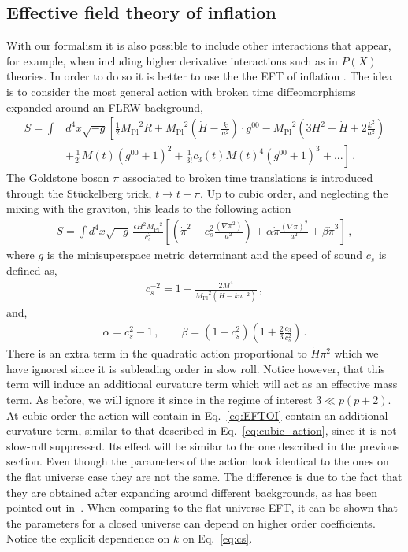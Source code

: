 \documentclass[a4paper,11pt]{article}
\numberwithin{equation}{section}
\newcommand{\mpl}{{M_{\mathrm{Pl}}}}
\numberwithin{equation}{section}
\begin{document}
\subsection{Effective field theory of inflation}
\label{sec:EFT}
With our formalism it is also possible to include other interactions that appear, for example,  when including higher derivative interactions such as in $P(X)$ theories. In order to do so it is better to use the  the EFT of inflation \cite{Cheung:2007st,Creminelli:2013cga}. The idea is to consider the most general action with broken time diffeomorphisms expanded around an FLRW background,
\begin{align}
S=\int &d^4 x \sqrt{-g}\left[\frac{1}{2}\mpl^2R+\mpl^2\left(\dot H-\frac{k}{a^2}\right)\cdot g^{00}-\mpl^2\left(3H^2+\dot H+2\frac{k^2}{a^2}\right)\right.\nonumber\\
&\left.+\frac{1}{2!}M(t)(g^{00}+1)^2+\frac{1}{3!}c_3(t)M(t)^4(g^{00}+1)^3+...\right] \,.
\end{align}
The Goldstone boson $\pi$ associated to broken time translations is introduced through the St\"uckelberg trick, $t\to t+\pi$. Up to cubic order, and  neglecting the mixing with the graviton, this leads to the following action
\begin{align}
S=\int d^4 x\sqrt{-g} \, \frac{\epsilon H^2\mpl^2}{c_s^2}\left[\left(\dot\pi^2-c_s^2\frac{(\nabla\pi^2)}{a^2}\right)+\alpha\dot\pi\frac{(\nabla\pi)^2}{a^2}+\beta\dot\pi^3\right] \,,
\label{eq:EFTOI}
\end{align}
where $g$ is the minisuperspace metric determinant and the speed of sound $c_s$ is defined as,
\begin{align}
c_s^{-2}=1-\frac{2M^4}{\mpl^2(\dot H-ka^{-2})} \,,
\label{eq:cs}
\end{align}
and,
\begin{align}
\alpha=c_s^2-1\,,\qquad \beta=(1-c_s^2)\left(1+\frac{2}{3}\frac{c_3}{c_s^2}\right) \,.
\end{align}
There is an extra term in the quadratic action proportional to $\dot H\pi^2$ which we have ignored since it is subleading order in slow roll. Notice however, that this term  will induce an additional  curvature term  which will act as an effective mass term. As before, we will ignore it since in the regime of interest $3\ll p(p+2)$.
 At cubic order the action will contain in Eq.~\eqref{eq:EFTOI} contain an additional  curvature term, similar to that described in Eq.~\eqref{eq:cubic_action}, since it is not slow-roll suppressed. Its effect will be similar to the one described in the previous section. Even though the parameters of the action look identical to the ones on the flat universe case they are not the same. The difference is due to the fact that they are obtained after expanding around different backgrounds, as  has been pointed out in~\cite{Creminelli:2013cga}. When comparing to the flat universe EFT, it can be shown that the parameters for a closed universe  can depend on higher order coefficients. Notice the explicit dependence on $k$ on Eq.~\eqref{eq:cs}.
\end{document}
